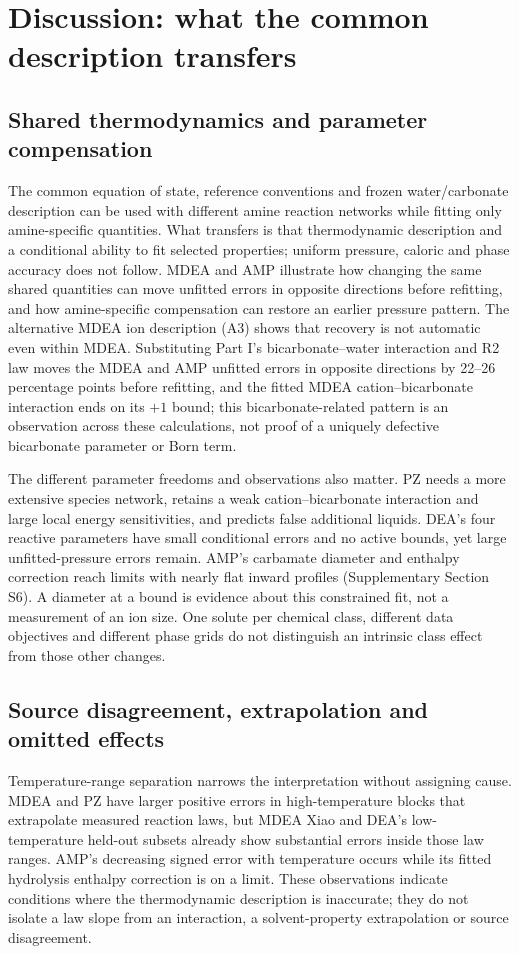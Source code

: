 \section{Discussion: what the common description transfers}\label{sec:p2-discussion}
\subsection{Shared thermodynamics and parameter compensation}
The common equation of state, reference conventions and frozen water/carbonate description can be used with different amine reaction networks while fitting only amine-specific quantities.
What transfers is that thermodynamic description and a conditional ability to fit selected properties; uniform pressure, caloric and phase accuracy does not follow.
MDEA and AMP illustrate how changing the same shared quantities can move unfitted errors in opposite directions before refitting, and how amine-specific compensation can restore an earlier pressure pattern.
The alternative MDEA ion description (A3) shows that recovery is not automatic even within MDEA.
Substituting Part I's bicarbonate--water interaction and R2 law moves the MDEA and AMP unfitted errors in opposite directions by 22--26 percentage points before refitting, and the fitted MDEA cation--bicarbonate interaction ends on its $+1$ bound; this bicarbonate-related pattern is an observation across these calculations, not proof of a uniquely defective bicarbonate parameter or Born term.

The different parameter freedoms and observations also matter.
PZ needs a more extensive species network, retains a weak cation--bicarbonate interaction and large local energy sensitivities, and predicts false additional liquids.
DEA's four reactive parameters have small conditional errors and no active bounds, yet large unfitted-pressure errors remain.
AMP's carbamate diameter and enthalpy correction reach limits with nearly flat inward profiles (Supplementary Section S6).
A diameter at a bound is evidence about this constrained fit, not a measurement of an ion size.
One solute per chemical class, different data objectives and different phase grids do not distinguish an intrinsic class effect from those other changes.

\subsection{Source disagreement, extrapolation and omitted effects}
Temperature-range separation narrows the interpretation without assigning cause.
MDEA and PZ have larger positive errors in high-temperature blocks that extrapolate measured reaction laws, but MDEA Xiao and DEA's low-temperature held-out subsets already show substantial errors inside those law ranges.
AMP's decreasing signed error with temperature occurs while its fitted hydrolysis enthalpy correction is on a limit.
These observations indicate conditions where the thermodynamic description is inaccurate; they do not isolate a law slope from an interaction, a solvent-property extrapolation or source disagreement.

